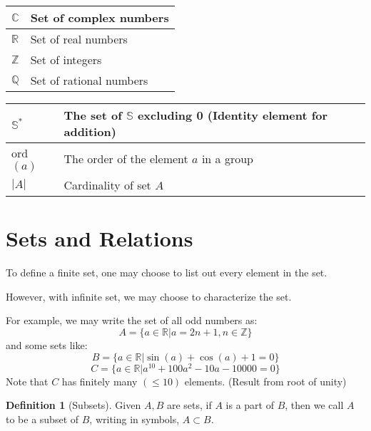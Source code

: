 \documentclass{article}
\theoremstyle{MyNonumberplain}
\theoremstyle{break}
\newcommand{\R}{\mathbb{R}}
\newcommand{\Q}{\mathbb{Q}}
\newcommand{\Z}{\mathbb{Z}}
\newcommand{\C}{\mathbb{C}}
\theoremstyle{break}
\theoremstyle{break}
\theoremstyle{definition}
\theoremstyle{break}
\newtheorem{definition}{Definition}[section]
\begin{document}
\begin{center}

    \begin{tabular}{|l|l|}
        \hline
        $\C$ & Set of complex numbers \\ \hline
        $\R$ & Set of real numbers \\ \hline
        $\Z$ & Set of integers \\ \hline
        $\Q$ & Set of rational numbers \\ \hline
    \end{tabular}
\end{center}
\begin{center}
    
    \begin{tabular}{|l|l|}
        \hline
        $\mathbb{S}^{*}$ & The set of $\mathbb{S}$ excluding 0 (Identity element for addition) \\ \hline
        ord$(a)$                                       & The order of the element $a$ in a group \\ \hline
        $|A|$                                          & Cardinality of set $A$ \\
        \hline                                                           
    \end{tabular}

\end{center}


\newpage

\tableofcontents

\newpage

\setcounter{section}{-1}

\section{Sets and Relations}

To define a finite set, one may choose to list out every element in the set.\bigskip

However, with infinite set, we may choose to characterize the set.\bigskip

For example, we may write the set of all odd numbers as:
        $$A=\{a\in\R|a=2n+1,n\in\Z\}$$
and some sets like:
        $$B=\{a\in\R|\sin(a)+\cos(a)+1=0\}$$
        $$C=\{a\in\R|a^{10}+100a^2-10a-10000=0\}$$
Note that $C$ has finitely many $(\leq 10)$ elements. (Result from root of unity)

\begin{defbox}
    \begin{definition}[Subsets]
        Given $A, B$ are sets, if $A$ is a part of $B$, then we call $A$ to be a subset of $B$,
        writing in symbols, $A \subset B$.
    \end{definition}    
\end{defbox}
\end{document}
